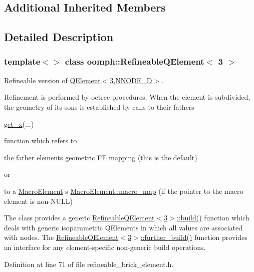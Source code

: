 \subsection*{Additional Inherited Members}


\subsection{Detailed Description}
\subsubsection*{template$<$$>$\newline
class oomph\+::\+Refineable\+Q\+Element$<$ 3 $>$}

Refineable version of \hyperlink{classoomph_1_1QElement_3_013_00_01NNODE__1D_01_4}{Q\+Element$<$3,\+N\+N\+O\+D\+E\+\_\+D$>$}.

Refinement is performed by octree procedures. When the element is subdivided, the geometry of its sons is established by calls to their father\textquotesingle{}s 
\begin{DoxyCode}
\hyperlink{classoomph_1_1FiniteElement_a6fc14cbf4e1d031acbc59b415cefa1ca}{get\_x}(...) 
\end{DoxyCode}
 function which refers to
\begin{DoxyItemize}
\item the father element\textquotesingle{}s geometric FE mapping (this is the default)
\end{DoxyItemize}or
\begin{DoxyItemize}
\item to a \hyperlink{classoomph_1_1MacroElement}{Macro\+Element} \textquotesingle{}s \hyperlink{classoomph_1_1MacroElement_a85e7842ad949bb4062a9ff302fa452e5}{Macro\+Element\+::macro\+\_\+map} (if the pointer to the macro element is non-\/\+N\+U\+LL)
\end{DoxyItemize}

The class provides a generic \hyperlink{classoomph_1_1RefineableQElement_3_013_01_4_a8e7f6c2a6aa695c1b6fcd4dbeba3fac6}{Refineable\+Q\+Element$<$3$>$\+::build()} function which deals with generic isoparametric Q\+Elements in which all values are associated with nodes. The \hyperlink{classoomph_1_1RefineableElement_a26628ce36dfad028686adeb4694a9ef3}{Refineable\+Q\+Element$<$3$>$\+::further\+\_\+build()} function provides an interface for any element-\/specific non-\/generic build operations. 

Definition at line 71 of file refineable\+\_\+brick\+\_\+element.\+h.



